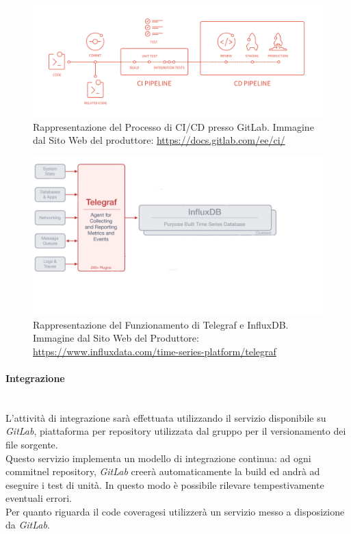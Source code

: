 \begin{figure}[H]
	\begin{center}
		\includegraphics[scale=0.18]{./images/cicd_pipeline_gitlab.png}
		\caption{Rappresentazione del Processo di CI/CD presso GitLab. Immagine dal Sito Web del produttore: \url{https://docs.gitlab.com/ee/ci/}}
	\end{center}
\end{figure}

\begin{figure}[H]
	\begin{center}
		\includegraphics[scale=0.4]{./images/influxTelegraf.png}
		\caption{Rappresentazione del Funzionamento di Telegraf e InfluxDB. Immagine dal Sito Web del Produttore: \url{https://www.influxdata.com/time-series-platform/telegraf}}
	\end{center}
\end{figure}

\paragraph{Integrazione}\label{Progettazione_Integrazione}\-\\
L'attività di integrazione sarà effettuata utilizzando il servizio disponibile su \textit{GitLab}, piattaforma per repository utilizzata dal gruppo per il versionamento dei file sorgente.\\
Questo servizio implementa un modello di integrazione continua: ad ogni commit\glossario nel repository\glossario, \textit{GitLab} creerà automaticamente la build ed andrà ad eseguire i test di unità. In questo modo è possibile rilevare tempestivamente eventuali errori.\\
Per quanto riguarda il code coverage\glossario si utilizzerà un servizio messo a disposizione da \textit{GitLab}.\\

